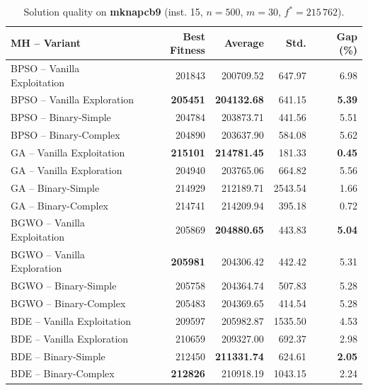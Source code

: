 \begin{table}[htbp]
  \centering
  \small
  \caption{Solution quality on \textbf{mknapcb9} (inst. 15, $n=500$, $m=30$, $f^*=215\,762$).}
  \label{tab:calidad_mknapcb9_15}
  \begin{tabular}{lrrrr}
    \toprule
    \textbf{MH -- Variant} &
    \textbf{Best Fitness} &
    \textbf{Average} &
    \textbf{Std.} &
    \textbf{Gap (\%)} \\
    \midrule
    BPSO -- Vanilla Exploitation &         201843 &        200709.52 & 647.97 &         6.98 \\
    BPSO -- Vanilla Exploration  & \textbf{205451} & \textbf{204132.68} & 641.15 & \textbf{5.39} \\
    BPSO -- Binary-Simple        &         204784 &        203873.71 & 441.56 &         5.51 \\
    BPSO -- Binary-Complex       &         204890 &        203637.90 & 584.08 &         5.62 \\
    \midrule
    GA -- Vanilla Exploitation   & \textbf{215101} & \textbf{214781.45} & 181.33 & \textbf{0.45} \\
    GA -- Vanilla Exploration    &         204940 &        203765.06 & 664.82 &         5.56 \\
    GA -- Binary-Simple          &         214929 &        212189.71 & 2543.54 &         1.66 \\
    GA -- Binary-Complex         &         214741 &        214209.94 & 395.18 &         0.72 \\
    \midrule
    BGWO -- Vanilla Exploitation &         205869 & \textbf{204880.65} & 443.83 & \textbf{5.04} \\
    BGWO -- Vanilla Exploration  & \textbf{205981} &        204306.42 & 442.42 &         5.31 \\
    BGWO -- Binary-Simple        &         205758 &        204364.74 & 507.83 &         5.28 \\
    BGWO -- Binary-Complex       &         205483 &        204369.65 & 414.54 &         5.28 \\
    \midrule
    BDE -- Vanilla Exploitation  &         209597 &        205982.87 & 1535.50 &         4.53 \\
    BDE -- Vanilla Exploration   &         210659 &        209327.00 & 692.37 &         2.98 \\
    BDE -- Binary-Simple         &         212450 & \textbf{211331.74} & 624.61 & \textbf{2.05} \\
    BDE -- Binary-Complex        & \textbf{212826} &        210918.19 & 1043.15 &         2.24 \\
    \bottomrule
  \end{tabular}
\end{table}

